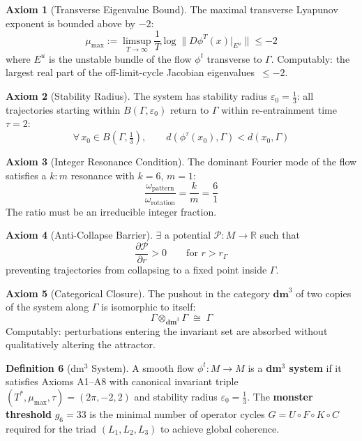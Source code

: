 \documentclass[11pt, a4paper]{article}
\theoremstyle{definition}
\newtheorem{axiom}{Axiom}[section]
\newtheorem{definition}[axiom]{Definition}
\newcommand{\dm}{\mathbf{dm}^3}
\newcommand{\Gam}{\Gamma}
\newcommand{\mumax}{\mu_{\max}}
\newcommand{\Tstar}{T^*}
\newcommand{\gmon}{g_6}
\newcommand{\EPS}{\varepsilon_0}
\begin{document}
\begin{axiom}[Transverse Eigenvalue Bound]\label{ax:A4}
The maximal transverse Lyapunov exponent is bounded above by $-2$:
\[
  \mumax := \limsup_{T \to \infty} \frac{1}{T} \log \|D\phi^T(x)|_{E^u}\| \leq -2
\]
where $E^u$ is the unstable bundle of the flow $\phi^t$ transverse to $\Gam$.
Computably: the largest real part of the off-limit-cycle Jacobian eigenvalues~$\leq -2$.
\end{axiom}

\begin{axiom}[Stability Radius]\label{ax:A5}
The system has stability radius $\EPS = \tfrac{1}{3}$: all trajectories starting within
$B(\Gam, \EPS)$ return to $\Gam$ within re-entrainment time $\tau = 2$:
\[
  \forall\, x_0 \in B\!\left(\Gam, \tfrac{1}{3}\right),\qquad
  d(\phi^\tau(x_0), \Gam) < d(x_0, \Gam)
\]
\end{axiom}

\begin{axiom}[Integer Resonance Condition]\label{ax:A6}
The dominant Fourier mode of the flow satisfies a $k{:}m$ resonance with $k=6$, $m=1$:
\[
  \frac{\omega_{\text{pattern}}}{\omega_{\text{rotation}}} = \frac{k}{m} = \frac{6}{1}
\]
The ratio must be an irreducible integer fraction.
\end{axiom}

\begin{axiom}[Anti-Collapse Barrier]\label{ax:A7}
$\exists$ a potential $\mathcal{P}: M \to \mathbb{R}$ such that
\[
  \frac{\partial \mathcal{P}}{\partial r} > 0 \qquad \text{for } r > r_\Gam
\]
preventing trajectories from collapsing to a fixed point inside $\Gam$.
\end{axiom}

\begin{axiom}[Categorical Closure]\label{ax:A8}
The pushout in the category $\dm$ of two copies of the system along $\Gam$ is isomorphic
to itself:
\[
  \Gam \otimes_{\dm} \Gam \;\cong\; \Gam
\]
Computably: perturbations entering the invariant set are absorbed without qualitatively
altering the attractor.
\end{axiom}

\begin{definition}[dm$^3$ System]
A smooth flow $\phi^t : M \to M$ is a \textbf{dm$^3$ system} if it satisfies Axioms
A1--A8 with canonical invariant triple $(\Tstar, \mumax, \tau) = (2\pi, -2, 2)$ and
stability radius $\EPS = \tfrac{1}{3}$.
The \textbf{monster threshold} $\gmon = 33$ is the minimal number of operator cycles
$G = U \circ F \circ K \circ C$ required for the triad $(L_1, L_2, L_3)$ to achieve
global coherence.
\end{definition}
\end{document}
